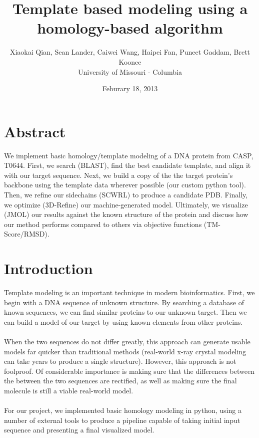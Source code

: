 \documentclass{article}
\title{Template based modeling using a homology-based algorithm}
\author{Xiaokai Qian, Sean Lander, Caiwei Wang, Haipei Fan, Puneet Gaddam, Brett Koonce\\University of Missouri - Columbia}
\date{Feburary 18, 2013}
\begin{document}
\maketitle

\section{Abstract}
We implement basic homology/template modeling of a DNA protein from CASP, T0644.  First, we search (BLAST), find the best candidate template, and align it with our target sequence.  Next, we build a copy of the the target protein's backbone using the template data wherever possible (our custom python tool).  Then, we refine our sidechains (SCWRL) to produce a candidate PDB.  Finally, we optimize (3D-Refine) our machine-generated model.  Ultimately, we visualize (JMOL) our results against the known structure of the protein and discuss how our method performs compared to others via objective functions (TM-Score/RMSD).

\section{Introduction}

Template modeling is an important technique in modern bioinformatics.  First, we begin with a DNA sequence of unknown structure.  By searching a database of known sequences, we can find similar proteins to our unknown target.  Then we can build a model of our target by using known elements from other proteins.\\\\
When the two sequences do not differ greatly, this approach can generate usable models far quicker than traditional methods (real-world x-ray crystal modeling can take years to produce a single structure).  However, this approach is not foolproof.  Of considerable importance is making sure that the differences between the between the two sequences are rectified, as well as making sure the final molecule is still a viable real-world model.\\\\
For our project, we implemented basic homology modeling in python, using a number of external tools to produce a pipeline capable of taking initial input sequence and presenting a final visualized model.
\end{document}
